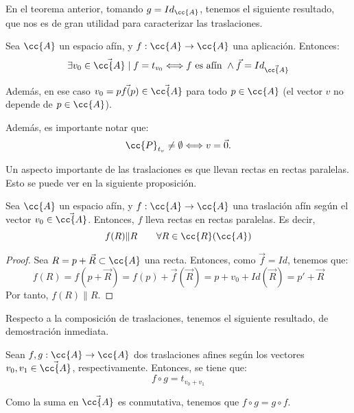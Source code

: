 En el teorema anterior, tomando $g=Id_{\cc{A}}$, tenemos el siguiente resultado, que nos es de gran utilidad para caracterizar las traslaciones.
\begin{coro}
    Sea $\cc{A}$ un espacio afín, y $f:\cc{A}\to \cc{A}$ una aplicación. Entonces:
    \begin{equation*}
        \exists v_0\in \vec{\cc{A}}\mid f=t_{v_0} \Longleftrightarrow f\text{ es afín }\land \vec{f}=Id_{\vec{\cc{A}}} 
    \end{equation*}

    Además, en ese caso $v_0=\vec{pf(p)}\in \vec{\cc{A}}$ para todo $p\in \cc{A}$ (el vector $v$ no depende de $p\in \cc{A}$).
\end{coro}

Además, es importante notar que:
\begin{equation*}
    \cc{P}_{t_v}\neq \emptyset \Longleftrightarrow v=\vec{0}.
\end{equation*}

Un aspecto importante de las traslaciones es que llevan rectas en rectas paralelas. Esto se puede ver en la siguiente proposición.
\begin{prop}
    Sea $\cc{A}$ un espacio afín, y $f:\cc{A}\to \cc{A}$ una traslación afín según el vector $v_0\in \vec{\cc{A}}$. Entonces, $f$ lleva rectas en rectas paralelas. Es decir,
    \begin{equation*}
        f(R)\| R \qquad \forall R\in \cc{R}(\cc{A})
    \end{equation*}
\end{prop}
\begin{proof}
    Sea $R=p+\vec{R}\subset \cc{A}$ una recta. Entonces, como $\vec{f}=Id$, tenemos que:
    \begin{equation*}
        f(R) = f(p+\vec{R}) = f(p) + \vec{f}(\vec{R}) = p+v_0 + Id(\vec{R}) = p' + \vec{R}
    \end{equation*}
    Por tanto, $f(R)\| R$.
\end{proof}

Respecto a la composición de traslaciones, tenemos el siguiente resultado, de demostración inmediata.
\begin{prop}
    Sean $f,g:\cc{A}\to \cc{A}$ dos traslaciones afines según los vectores $v_0,v_1\in \vec{\cc{A}}$, respectivamente. Entonces, se tiene que:
    \begin{equation*}
        f\circ g = t_{v_0+v_1}
    \end{equation*}
\end{prop}
Como la suma en $\vec{\cc{A}}$ es conmutativa, tenemos que $f\circ g = g\circ f$.

